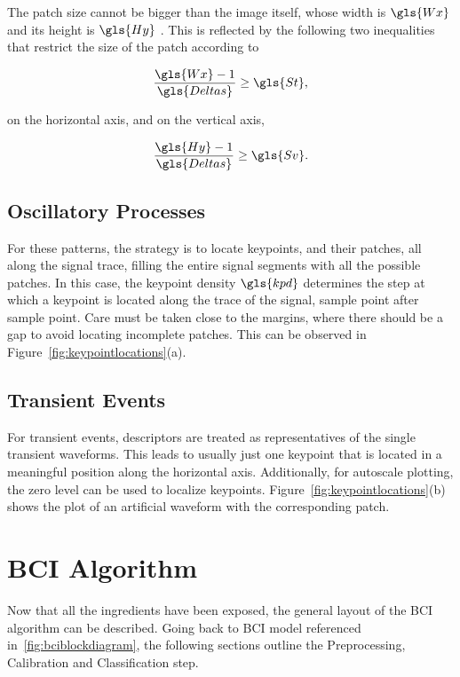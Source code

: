 The patch size cannot be bigger than the image itself, whose width is $\gls{Wx}$ and its height is $\gls{Hy}$ .  This is reflected by the following two inequalities that restrict the size of the patch according to 

\begin{equation}
\frac{\gls{Wx}-1}{\gls{Deltas}}  \geq \gls{St} ,
\label{eq:restriction1}
\end{equation}

\noindent on the horizontal axis, and on the vertical axis, 

\begin{equation}
\frac{\gls{Hy}-1}{\gls{Deltas}}  \geq \gls{Sv}.
\label{eq:restriction2}
\end{equation}

\subsection{Oscillatory Processes}

For these patterns, the strategy is to locate keypoints, and their patches, all along the signal trace, filling the entire signal segments with all the possible patches.  In this case, the keypoint density $\gls{kpd} $ determines the step at which a keypoint is located along the trace of the signal, sample point after sample point. Care must be taken close to the margins, where there should be a gap to avoid locating incomplete patches.  This can be observed in Figure~\ref{fig:keypointlocations}(a).

\subsection{Transient Events}

For transient events, descriptors are treated as representatives of the single transient waveforms.  This leads to usually just one keypoint that is located in a meaningful position along the horizontal axis.  Additionally, for autoscale plotting, the zero level can be used to localize keypoints. Figure~\ref{fig:keypointlocations}(b) shows the plot of an artificial waveform with the corresponding patch.

\section{BCI Algorithm}

Now that all the ingredients have been exposed, the general layout of the BCI algorithm can be described.  Going back to BCI model referenced in~\ref{fig:bciblockdiagram}, the following sections outline the Preprocessing, Calibration and Classification step.

